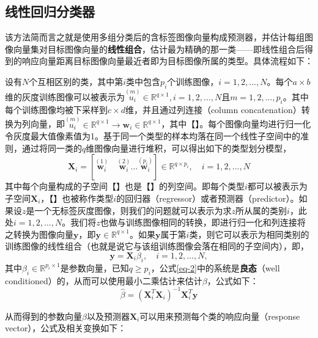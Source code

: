 \documentclass[UTF8]{ctexart}
\begin{document}
\subsection{线性回归分类器}
该方法简而言之就是使用多组分类后的含标签图像向量构成预测器，并估计每组图像向量集对目标图像向量的\textbf{线性组合}，估计最为精确的那一类——即线性组合后得到的响应向量距离目标图像向量最近者即为目标图像所属的类型。具体流程如下：\par
设有\(N\)个互相区别的类，其中第\(i\)类中包含\(p_i\)个训练图像，\(i=1,2,...,N\)。每个\(a \times b\)维的灰度训练图像可以被表示为\({\stackrel{(m)}{u_i}} \in {\mathbb{R}^{q \times 1}}, i = 1,2,\dots,N\)且\(m = 1,2,\dots,p_i\)。其中每个训练图像均被下采样到\(c \times d\)维，并且通过列连接（column concatenation）转换为列向量，即\({\stackrel{(m)}{u_i}} \in {\mathbb{R}^{q \times 1}} \rightarrow {\mathbf{w}_i} \in \mathbb{R}^{q \times 1}\)，其中【】。每个图像向量均进行归一化令灰度最大值像素值为1。基于同一个类型的样本均落在同一个线性子空间中的准则，通过将同一类的\(q\)维图像向量进行堆积，可以得出如下的类型划分模型，
\begin{equation}
    {\mathbf{X}_i = [\stackrel{(1)}{\mathbf{w}_i} \quad \stackrel{(2)}{\mathbf{w}_i} \dots \stackrel{(p_i)}{\mathbf{w}_i}] \in \mathbb{R}^{q \times p_i}},\quad i=1,2,\dots,N
\end{equation}
其中每个向量构成的子空间【】也是【】的列空间。即每个类型\(i\)都可以被表示为子空间\(\mathbf{X}_i\)，【】也被称作类型\(i\)的回归器（regressor）或者预测器（predictor）。如果设\(z\)是一个无标签灰度图像，则我们的问题就可以表示为求\(z\)所从属的类别\(i\)，此处\(i=1,2,...,N\)。我们将\(z\)也做与训练图像相同的转换，即进行归一化和列连接将之转换为图像向量\(\mathbf{y}\)，即\(\mathbf{y}\in\mathbb{R}^{q \times 1}\)。如果\(\mathbf{y}\)属于第\(i\)类，则它可以表示为相同类别的训练图像的线性组合（也就是说它与该组训练图像会落在相同的子空间内），即，
\begin{equation}\label{eq-2} %
    \mathbf{y}=\mathbf{X}_i\beta_i,\quad i=1,2,\ldots,N,
\end{equation}
其中\(\beta_i\in\mathbb{R}^{p_i \times 1}\)是参数向量，已知\(q \ge p_i\)，公式\eqref{eq-2}中的系统是\textbf{良态}（well conditioned）的，从而可以使用最小二乘估计来估计\(\beta\)，公式如下：
\begin{equation}\label{eq-3}
    \hat{\beta}={(\mathbf{X}^T_i\mathbf{X}_i)^{-1}\mathbf{X}^T_i\mathbf{y}}
\end{equation}
\par
从而得到的参数向量\(\beta\)以及预测器\(\mathbf{X}_i\)可以用来预测每个类的响应向量（response vector），公式及相关变换如下：
\end{document}

